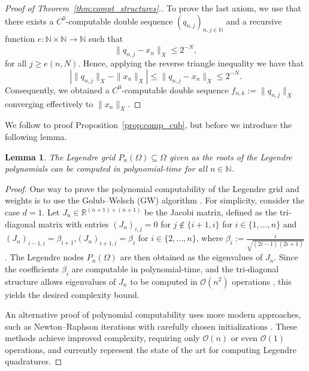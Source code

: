\documentclass[pdflatex]{sn-jnl}%
\newtheorem{lemma}[theorem]{Lemma}
\begin{document}
\begin{proof}[Proof of Theorem~\ref{thm:compt_structures}.]
    To prove the last axiom, we use that there exists a $C^0$-computable double sequence $(q_{n,j})_{n,j\in \mathbb{N}}$ and a recursive function $e:\mathbb{N}\times \mathbb{N}\rightarrow\mathbb{N}$ such that 
    \begin{equation}
        \|q_{n,j}-x_n\|_X\leq 2^{-N},
    \end{equation}
    for all $j\geq e(n,N)$. Hence, applying the reverse triangle inequality we have that 
    \begin{equation}
        |\|q_{n,j}\|_X-\|x_n\|_{X}|\leq \|q_{n,j}-x_n\|_X\leq 2^{-N}.
    \end{equation}
    Consequently, we obtained a $C^0$-computable double sequence $f_{n,k}:=\|q_{n,j}\|_X$ converging effectively to $\|x_n\|_X$. 
\end{proof}
We follow to proof Proposition~\ref{prop:comp_cub}, but before we introduce the following lemma. 
\begin{lemma}\label{comp_Leg_grid}
    The Legendre grid $P_n(\Omega)\subseteq \Omega$ given as the roots of the Legendre polynomials can be computed in polynomial-time for all $n\in \mathbb{N}$. 
\end{lemma}
\vspace{-1em}\begin{proof}
One way to prove the polynomial computability of the Legendre grid and weights is to use the Golub–Welsch (GW) algorithm \cite{GW-Method}. For simplicity, consider the case $d=1$. Let $J_n \in \mathbb{R}^{(n+1)\times (n+1)}$ be the Jacobi matrix, defined as the tri-diagonal matrix with entries $(J_n)_{i,j} = 0$ for $j\not\in \{i+1,i\}$ for $i\in \{1,\dots,n\}$ and $(J_n)_{i-1,i} = \beta_{i+1}$,$(J_n)_{i+1,i} = \beta_{i}$ for $i\in \{2,\dots,n\}$, 
where $\beta_i:= \frac{i}{\sqrt{(2i-1)(2i+1)}}$. The Legendre nodes $P_n(\Omega)$ are then obtained as the eigenvalues of $J_n$. Since the coefficients $\beta_i$ are computable in polynomial-time, and the tri-diagonal structure allows eigenvalues of $J_n$ to be computed in $\mathcal{O}(n^2)$ operations \cite{Hale2013-zy}, this yields the desired complexity bound.

An alternative proof of polynomial computability uses more modern approaches, such as Newton–Raphson iterations with carefully chosen initializations \cite{Petras1999-kp}. These methods achieve improved complexity, requiring only $\mathcal{O}(n)$ \cite{Hale2013-zy} or even $\mathcal{O}(1)$ \cite{Bogaert2012-wf} operations, and currently represent the state of the art for computing Legendre quadratures.
\end{proof}
\end{document}
